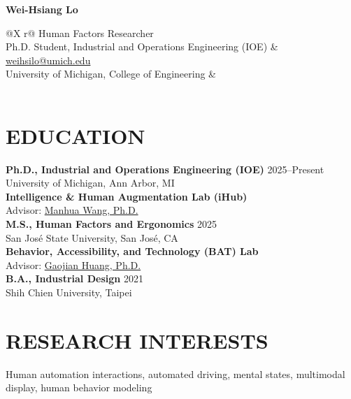 \documentclass[11pt]{article}
\begin{document}
\begin{minipage}[t]{\textwidth}
    {\LARGE \bfseries Wei-Hsiang Lo} \\[0.5em]
    \begin{tabularx}{\textwidth}{@{}X r@{}} 
        Human Factors Researcher\\
        Ph.D. Student, Industrial and Operations Engineering (IOE) & 
        \href{mailto:weihsilo@umich.edu}{weihsilo@umich.edu} \\
        University of Michigan, College of Engineering & \\
         \\
    \end{tabularx}
\end{minipage}

\vspace{0.5em}

\section*{EDUCATION}
\noindent \textbf{Ph.D., Industrial and Operations Engineering (IOE)} \hfill 2025--Present\\
University of Michigan, Ann Arbor, MI\\
\textbf{Intelligence \& Human Augmentation Lab (iHub)}\\
Advisor: \href{https://ioe.engin.umich.edu/people/manhua-wang/}{Manhua Wang, Ph.D.}
\\[0.7em]
\textbf{M.S., Human Factors and Ergonomics} \hfill 2025\\
San José State University, San José, CA\\
\textbf{Behavior, Accessibility, and Technology (BAT) Lab}\\
Advisor: \href{https://www.sjsu.edu/people/gaojian.huang/}{Gaojian Huang, Ph.D.}\\[0.7em]
\textbf{B.A., Industrial Design} \hfill 2021\\
Shih Chien University, Taipei\\

\vspace{-0.5em}

\section*{RESEARCH INTERESTS}
Human automation interactions, automated driving, mental states, multimodal display, human behavior modeling
\end{document}
